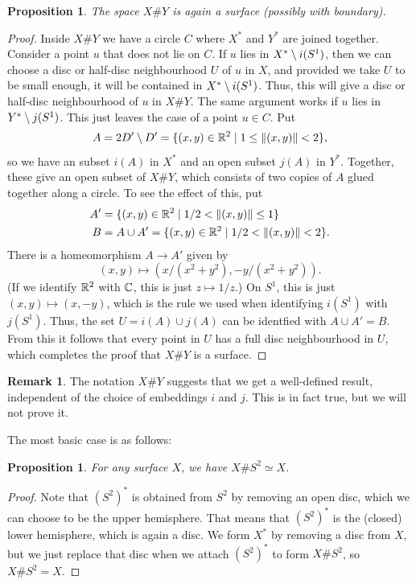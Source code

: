 \documentclass[reqno]{amsart}
\newtheorem{proposition}[theorem]{Proposition}
\theoremstyle{definition}
\newtheorem{remark}[theorem]{Remark}
\begin{document}
\begin{proposition}\label{prop-sum-surface}
 The space $X\# Y$ is again a surface (possibly with boundary).  
\end{proposition}
\begin{proof}
 Inside $X\# Y$ we have a circle $C$ where $X^*$ and $Y^*$ are joined
 together.  Consider a point $u$ that does not lie on $C$.  If $u$
 lies in $X^*\setminus i(S^1)$, then we can choose a disc or half-disc
 neighbourhood $U$ of $u$ in $X$, and provided we take $U$ to be small
 enough, it will be contained in $X^*\setminus i(S^1)$.  Thus, this will
 give a disc or half-disc neighbourhood of $u$ in $X\# Y$.  The same
 argument works if $u$ lies in $Y^*\setminus j(S^1)$.  This just leaves the
 case of a point $u\in C$.  Put 
 \[ A=2D'\setminus D'=\{(x,y)\in\mathbb{R}^2 \;|\; 1\leq \|(x,y)\| < 2\}, \]
 so we have an subset $i(A)$ in $X^*$ and an open subset $j(A)$ in
 $Y^*$.  Together, these give an open subset of $X\# Y$, which
 consists of two copies of $A$ glued together along a circle.  To see
 the effect of this, put 
 \begin{align*}
  A' &= \{(x,y)\in\mathbb{R}^2\;|\; 1/2 < \|(x,y)\| \leq 1\} \\
  B  &=  A\cup A' = \{(x,y)\in\mathbb{R}^2\;|\; 1/2 < \|(x,y)\| < 2\}.
 \end{align*}
 There is a homeomorphism $A\to A'$ given by 
 \[ (x,y)\mapsto(x/(x^2+y^2),-y/(x^2+y^2)). \]
 (If we identify $\mathbb{R}^2$ with $\mathbb{C}$, this is just $z\mapsto 1/z$.)  On
 $S^1$, this is just $(x,y)\mapsto(x,-y)$, which is the rule we used
 when identifying $i(S^1)$ with $j(S^1)$.  Thus, the set
 $U=i(A)\cup j(A)$ can be identfied with $A\cup A'=B$.  From this it
 follows that every point in $U$ has a full disc neighbourhood in $U$,
 which completes the proof that $X\# Y$ is a surface. 
\end{proof}

\begin{remark}\label{rem-sum-well-defined}
 The notation $X\# Y$ suggests that we get a well-defined result,
 independent of the choice of embeddings $i$ and $j$.  This is in fact
 true, but we will not prove it.
\end{remark}

The most basic case is as follows:
\begin{proposition}
 For any surface $X$, we have $X\# S^2\simeq X$.
\end{proposition}
\begin{proof}
 Note that $(S^2)^*$ is obtained from $S^2$ by removing an open disc,
 which we can choose to be the upper hemisphere.  That means that
 $(S^2)^*$ is the (closed) lower hemisphere, which is again a disc.
 We form $X^*$ by removing a disc from $X$, but we just replace that
 disc when we attach $(S^2)^*$ to form $X\# S^2$, so $X\# S^2=X$.
\end{proof}
\end{document}

